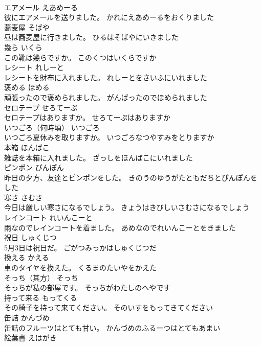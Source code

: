 \documentclass[8pt]{extreport}
\begin{document}
\begin{CJK}{UTF8}{min}
\\	エアメール	えあめーる	
\\	彼にエアメールを送りました。	かれにえあめーるをおくりました	
\\	蕎麦屋	そばや	
\\	昼は蕎麦屋に行きました。	ひるはそばやにいきました	
\\	幾ら	いくら	
\\	この靴は幾らですか。	このくつはいくらですか	
\\	レシート	れしーと	
\\	レシートを財布に入れました。	れしーとをさいふにいれました	
\\	褒める	ほめる	
\\	頑張ったので褒められました。	がんばったのでほめられました	
\\	セロテープ	せろてーぷ	
\\	セロテープはありますか。	せろてーぷはありますか	
\\	いつごろ（何時頃）	いつごろ	
\\	いつごろ夏休みを取りますか。	いつごろなつやすみをとりますか	
\\	本箱	ほんばこ	
\\	雑誌を本箱に入れました。	ざっしをほんばこにいれました	
\\	ピンポン	ぴんぽん	
\\	昨日の夕方、友達とピンポンをした。	きのうのゆうがたともだちとぴんぽんをした	
\\	寒さ	さむさ	
\\	今日は厳しい寒さになるでしょう。	きょうはきびしいさむさになるでしょう	
\\	レインコート	れいんこーと	
\\	雨なのでレインコートを着ました。	あめなのでれいんこーとをきました	
\\	祝日	しゅくじつ	
\\	5月3日は祝日だ。	ごがつみっかはしゅくじつだ	
\\	換える	かえる	
\\	車のタイヤを換えた。	くるまのたいやをかえた	
\\	そっち（其方）	そっち	
\\	そっちが私の部屋です。	そっちがわたしのへやです	
\\	持って来る	もってくる	
\\	その椅子を持って来てください。	そのいすをもってきてください	
\\	缶詰	かんづめ	
\\	缶詰のフルーツはとても甘い。	かんづめのふるーつはとてもあまい	
\\	絵葉書	えはがき	

\end{CJK}
\end{document}
